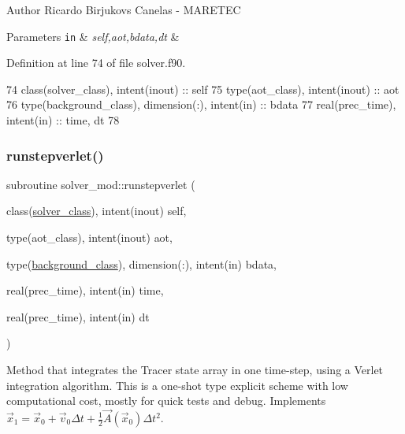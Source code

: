 \begin{DoxyAuthor}{Author}
Ricardo Birjukovs Canelas -\/ M\+A\+R\+E\+T\+EC 
\end{DoxyAuthor}

\begin{DoxyParams}[1]{Parameters}
\mbox{\tt in}  & {\em self,aot,bdata,dt} & \\
\hline
\end{DoxyParams}


Definition at line 74 of file solver.\+f90.


\begin{DoxyCode}
74     \textcolor{keywordtype}{class}(solver\_class), \textcolor{keywordtype}{intent(inout)} :: self
75     \textcolor{keywordtype}{type}(aot\_class), \textcolor{keywordtype}{intent(inout)} :: aot
76     \textcolor{keywordtype}{type}(background\_class), \textcolor{keywordtype}{dimension(:)}, \textcolor{keywordtype}{intent(in)} :: bdata
77     \textcolor{keywordtype}{real(prec\_time)}, \textcolor{keywordtype}{intent(in)} :: time, dt
78 
\end{DoxyCode}
\mbox{\label{namespacesolver__mod_acf893016edd8e0eb4bc77666aed1096f}} 
\subsubsection{\texorpdfstring{runstepverlet()}{runstepverlet()}}
{\footnotesize\ttfamily subroutine solver\+\_\+mod\+::runstepverlet (\begin{DoxyParamCaption}\item[{class(\mbox{\hyperlink{structsolver__mod_1_1solver__class}{solver\+\_\+class}}), intent(inout)}]{self,  }\item[{type(aot\+\_\+class), intent(inout)}]{aot,  }\item[{type(\mbox{\hyperlink{structbackground__mod_1_1background__class}{background\+\_\+class}}), dimension(\+:), intent(in)}]{bdata,  }\item[{real(prec\+\_\+time), intent(in)}]{time,  }\item[{real(prec\+\_\+time), intent(in)}]{dt }\end{DoxyParamCaption})\hspace{0.3cm}{\ttfamily [private]}}



Method that integrates the Tracer state array in one time-\/step, using a Verlet integration algorithm. This is a one-\/shot type explicit scheme with low computational cost, mostly for quick tests and debug. Implements $ {\vec {x}}_{1}={\vec {x}}_{0}+{\vec {v}}_{0}\Delta t+{\frac {1}{2}}{\vec {A}}({\vec {x}}_{0})\Delta t^{2}$. 

